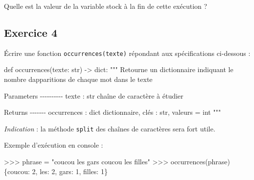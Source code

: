 \documentclass[
  a4paper,
  DIV=11,
  numbers=noendperiod]{scrartcl}
\newenvironment{Shaded}{\begin{snugshade}}{\end{snugshade}}
\newcommand{\BuiltInTok}[1]{\textcolor[rgb]{0.00,0.23,0.31}{#1}}
\newcommand{\CommentTok}[1]{\textcolor[rgb]{0.37,0.37,0.37}{#1}}
\newcommand{\DecValTok}[1]{\textcolor[rgb]{0.68,0.00,0.00}{#1}}
\newcommand{\KeywordTok}[1]{\textcolor[rgb]{0.00,0.23,0.31}{#1}}
\newcommand{\NormalTok}[1]{\textcolor[rgb]{0.00,0.23,0.31}{#1}}
\newcommand{\OperatorTok}[1]{\textcolor[rgb]{0.37,0.37,0.37}{#1}}
\newcommand{\StringTok}[1]{\textcolor[rgb]{0.13,0.47,0.30}{#1}}
\begin{document}
Quelle est la valeur de la variable stock à la fin de cette exécution ?

\hypertarget{fa-desktop-exercice-4}{%
\subsection{\texorpdfstring{ Exercice
4}{ Exercice 4}}\label{fa-desktop-exercice-4}}

Écrire une fonction \texttt{occurrences(texte)} répondant aux
spécifications ci-dessous :

\begin{Shaded}
\begin{Highlighting}[]
\KeywordTok{def}\NormalTok{ occurrences(texte: }\BuiltInTok{str}\NormalTok{) }\OperatorTok{{-}\textgreater{}} \BuiltInTok{dict}\NormalTok{:}
    \CommentTok{"""}
\CommentTok{    Retourne un dictionnaire indiquant le nombre d\textquotesingle{}apparitions de chaque mot dans le texte}

\CommentTok{    Parameters}
\CommentTok{    {-}{-}{-}{-}{-}{-}{-}{-}{-}{-}}
\CommentTok{    texte : str}
\CommentTok{        chaîne de caractère à étudier}

\CommentTok{    Returns}
\CommentTok{    {-}{-}{-}{-}{-}{-}{-}}
\CommentTok{    occurrences : dict}
\CommentTok{        dictionnaire, clés : str, valeurs = int}
\CommentTok{    """}
\end{Highlighting}
\end{Shaded}

\emph{Indication} : la méthode \texttt{split} des chaînes de caractères
sera fort utile.

Exemple d'exécution en console :

\begin{Shaded}
\begin{Highlighting}[]
\OperatorTok{\textgreater{}\textgreater{}\textgreater{}}\NormalTok{ phrase }\OperatorTok{=} \StringTok{"coucou les gars coucou les filles"}
\OperatorTok{\textgreater{}\textgreater{}\textgreater{}}\NormalTok{ occurrences(phrase)}
\NormalTok{\{}\StringTok{\textquotesingle{}coucou\textquotesingle{}}\NormalTok{: }\DecValTok{2}\NormalTok{, }\StringTok{\textquotesingle{}les\textquotesingle{}}\NormalTok{: }\DecValTok{2}\NormalTok{, }\StringTok{\textquotesingle{}gars\textquotesingle{}}\NormalTok{: }\DecValTok{1}\NormalTok{, }\StringTok{\textquotesingle{}filles\textquotesingle{}}\NormalTok{: }\DecValTok{1}\NormalTok{\}}
\end{Highlighting}
\end{Shaded}
\end{document}
